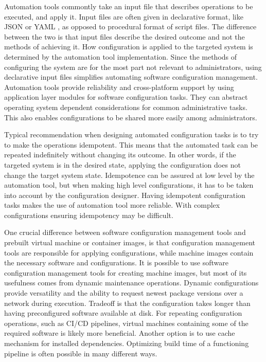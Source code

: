 Automation tools commontly take an input file that describes operations to be
executed, and apply it. Input files are often given in declarative format, like
JSON \cite{json} or YAML \cite{yaml}, as opposed to procedural format of script
files. The difference between the two is that input files describe the desired
outcome and not the methods of achieving it. How configuration is applied to
the targeted system is determined by the automation tool implementation. Since
the methods of configuring the system are for the most part not relevant to
administrators, using declarative input files simplifies automating software
configuration management. Automation tools provide reliability and
cross-platform support by using application layer modules for software
configuration tasks. They can abstract operating system dependent
considerations for common administrative tasks. This also enables
configurations to be shared more easily among administrators.

Typical recommendation when designing automated configuration tasks is to try
to make the operations idempotent. This means that the automated task can be
repeated indefinitely without changing its outcome. In other words, if the
targeted system is in the desired state, applying the configuration does not
change the target system state. Idempotence can be assured at low level by the
automation tool, but when making high level configurations, it has to be taken
into account by the configuration designer. Having idempotent configuration
tasks makes the use of automation tool more reliable. With complex
configurations ensuring idempotency may be difficult.

One crucial difference between software configuration management tools and
prebuilt virtual machine or container images, is that configuration management
tools are responsible for applying configurations, while machine images contain
the necessary software and configurations. It is possible to use software
configuration management tools for creating machine images, but most of its
usefulness comes from dynamic maintenance operations. Dynamic configurations
provide versatility and the ability to request newest package versions over a
network during execution. Tradeoff is that the configuration takes longer than
having preconfigured software available at disk. For repeating configuration
operations, such as CI/CD pipelines, virtual machines containing some of the
required software is likely more beneficial. Another option is to use cache
mechanism for installed dependencies. Optimizing build time of a functioning
pipeline is often possible in many different ways.

